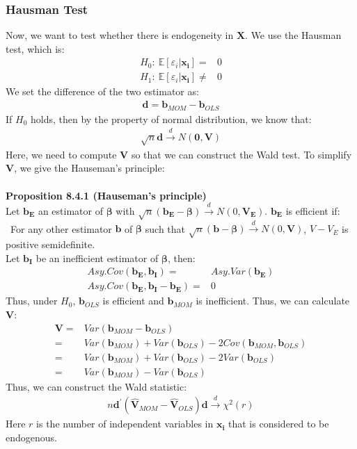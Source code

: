 \documentclass{article}
\begin{document}
\subsubsection{Hausman Test}
Now, we want to test whether there is endogeneity in $\boldsymbol{X}$. We use the Hausman test, which is:
	\begin{align*}
		H_0:\ \mathbb{E}[\varepsilon_i | \boldsymbol{x_i}] = &0\\
		H_1:\ \mathbb{E}[\varepsilon_i | \boldsymbol{x_i}] \neq & 0
	\end{align*} 
We set the difference of the two estimator as:
	\begin{align*}
		\boldsymbol{d} = \boldsymbol{b}_{MOM} - \boldsymbol{b}_{OLS}
	\end{align*} 
If $H_0$ holds, then by the property of normal distribution, we know that:
	\begin{align*}
		\sqrt{n}\boldsymbol{d} \xrightarrow{d} N(\boldsymbol{0}, \boldsymbol{V})
	\end{align*}
Here, we need to compute $\boldsymbol{V}$ so that we can construct the Wald test. To simplify $\boldsymbol{V}$, we give the Hauseman's principle:\\\\
\textbf{Proposition 8.4.1 (Hauseman's principle)}\\
Let $\boldsymbol{b_E}$ an estimator of $\boldsymbol{\beta}$ with $\sqrt{n}(\boldsymbol{b_E} - \boldsymbol{\beta}) \xrightarrow{d} N(0, \boldsymbol{V_E})$. $\boldsymbol{b_E}$ is efficient if:\\\
For any other estimator $\boldsymbol{b}$ of $\boldsymbol{\beta}$ such that $\sqrt{n}(\boldsymbol{b} - \boldsymbol{\beta}) \xrightarrow{d} N(0, \boldsymbol{V})$, $V- V_E$ is positive semidefinite.\\
Let $\boldsymbol{b_I}$ be an inefficient estimator of $\boldsymbol{\beta}$, then:
	\begin{align*}
		Asy.Cov(\boldsymbol{b_E}, \boldsymbol{b_I}) = &Asy.Var(\boldsymbol{b_E})\\
		Asy.Cov(\boldsymbol{b_E}, \boldsymbol{b_I} - \boldsymbol{b_E}) = &0
	\end{align*}
Thus, under $H_0$, $\boldsymbol{b}_{OLS}$ is efficient and $\boldsymbol{b}_{MOM}$ is inefficient. Thus, we can calculate $\boldsymbol{V}$:
	\begin{align*}
		\boldsymbol{V} = &Var(\boldsymbol{b}_{MOM} - \boldsymbol{b}_{OLS})\\ = &
		Var(\boldsymbol{b}_{MOM}) + Var(\boldsymbol{b}_{OLS}) - 2Cov(\boldsymbol{b}_{MOM}, \boldsymbol{b}_{OLS})\\ = &
		Var(\boldsymbol{b}_{MOM}) + Var(\boldsymbol{b}_{OLS}) - 2Var(\boldsymbol{b}_{OLS})\\ = &
		Var(\boldsymbol{b}_{MOM}) - Var(\boldsymbol{b}_{OLS})
	\end{align*}
Thus, we can construct the Wald statistic:
	\begin{align*}
		n\boldsymbol{d}^\prime (\hat{\boldsymbol{V}}_{MOM} - \hat{\boldsymbol{V}}_{OLS})\boldsymbol{d} \xrightarrow{d} \chi^2(r)
	\end{align*}
Here $r$ is the number of independent variables in $\boldsymbol{x_i}$ that is considered to be endogenous.
\end{document}
